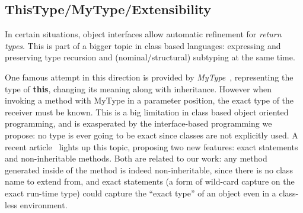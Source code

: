 % 

\subsection{ThisType/MyType/Extensibility}

In certain situations, object interfaces allow automatic refinement for \emph{return
types}. This is part of a bigger topic in class based languages: expressing and
preserving type recursion and (nominal/structural) subtyping at the same time.

One famous attempt in this direction is provided by
\emph{MyType}~\cite{bruce1994paradigmatic}, representing the type of
\textbf{this}, changing its meaning along with inheritance. However when
invoking a method with MyType in a parameter position, the exact type of the
receiver must be known.  This is a big limitation in class based object oriented
programming, and is exasperated by the interface-based programming we propose: no
type is ever going to be exact since classes are not explicitly used. A recent
article~\cite{Saito2013933} lights up this topic, proposing two
new features: exact statements and non-inheritable methods. Both are
related to our work: any method generated inside of the \Q@of@ method is indeed
non-inheritable, since there is no class name to extend from, and exact
statements (a form of wild-card capture on the exact run-time type) could
capture the ``exact type'' of an object even in a class-less environment.






